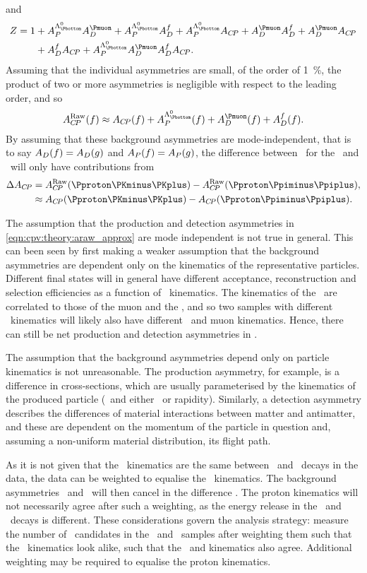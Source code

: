 and
\begin{align}
  Z = 1 &+ \APLb\ADmu + \APLb\ADf + \APLb\ACP + \ADmu\ADf + \ADmu\ACP \nonumber\\
        &+ \ADf\ACP + \APLb\ADmu\ADf\ACP.
\end{align}
Assuming that the individual asymmetries are small, of the order of
\SI{1}{\percent}, the product of two or more asymmetries is negligible with
respect to the leading order, and so
\begin{equation}
  \ARaw(f) \approx \ACP(f) + \APLb(f) + \ADmu(f) + \ADf(f).
  \label{eqn:cpv:theory:araw_approx}
\end{equation}
By assuming that these background asymmetries are mode-independent, that is to
say $A_{D}(f) = A_{D}(g)$ and $A_{P}(f) = A_{P}(g)$, the difference between \ARaw\ for
the \pKK\ and \ppipi\ will only have contributions from \ACP
\begin{align}
  \dACP &= \ARaw(\pKK) - \ARaw(\ppipi),\label{eqn:cpv:theory:dacp}\\
        &\approx \ACP(\pKK) - \ACP(\ppipi)\nonumber.
\end{align}

The assumption that the production and detection asymmetries in
\cref{eqn:cpv:theory:araw_approx} are mode independent is not true in general.
This can been seen by first making a weaker assumption that the background
asymmetries are dependent only on the kinematics of the representative
particles.
Different final states will in general have different acceptance,
reconstruction and selection efficiencies as a function of \PLambdac\
kinematics.
The kinematics of the \PLambdac\ are correlated to those of the muon and the
\PLambdab, and so two samples with different \PLambdac\ kinematics will likely
also have different \PLambdab\ and muon kinematics.
Hence, there can still be net production and detection asymmetries in \dACP\@.

The assumption that the background asymmetries depend only on particle
kinematics is not unreasonable.
The production asymmetry, for example, is a difference in cross-sections, which
are usually parameterised by the kinematics of the produced particle (\pT\ and
either \Eta\ or rapidity).
Similarly, a detection asymmetry describes the differences of material
interactions between matter and antimatter, and these are dependent on the
momentum of the particle in question and, assuming a non-uniform material
distribution, its flight path.

As it is not given that the \PLambdac\ kinematics are the same between
\LcTopKK\ and \LcToppipi\ decays in the data, the data can be weighted to
equalise the \PLambdac\ kinematics.
The background asymmetries \AP\ and \ADmu\ will then cancel in the difference
\dACP\@.
The proton kinematics will not necessarily agree after such a weighting, as the
energy release in the \pKK\ and \ppipi\ decays is different.
These considerations govern the analysis strategy: measure the number of
\PLambdac\ candidates in the \pKK\ and \ppipi\ samples after weighting them
such that the \PLambdac\ kinematics look alike, such that the \PLambdab\ and
\Pmuon kinematics also agree.
Additional weighting may be required to equalise the proton kinematics.


